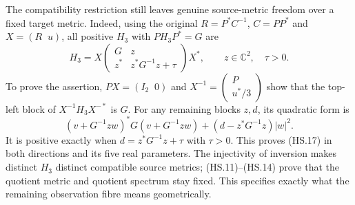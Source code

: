 The compatibility restriction still leaves genuine source-metric
freedom over a fixed target metric. Indeed, using the original
$R=P^*C^{-1}$, $C=PP^*$ and $X=(R\;\;u)$, all positive $H_3$
with $PH_3P^*=G$ are
\[
 H_3=X\begin{pmatrix}G&z\\z^*&z^*G^{-1}z+\tau\end{pmatrix}X^*,
 \qquad z\in\mathbb C^2,\quad \tau>0.                         \tag{HS.17}
\]
To prove the assertion, $PX=(I_2\;\;0)$ and
$X^{-1}=\left(\begin{smallmatrix}P\\u^*/3\end{smallmatrix}\right)$
show that the top-left block of $X^{-1}H_3X^{-*}$ is $G$.
For any remaining blocks $z,d$, its quadratic form is
\[
 (v+G^{-1}zw)^*G(v+G^{-1}zw)
       +(d-z^*G^{-1}z)|w|^2.
\]
It is positive exactly when $d=z^*G^{-1}z+\tau$ with $\tau>0$.
This proves (HS.17) in both directions and its five real parameters.
The injectivity of inversion makes distinct $H_3$ distinct compatible
source metrics; (HS.11)--(HS.14) prove that the quotient metric and
quotient spectrum stay fixed. This specifies exactly what the
remaining observation fibre means geometrically.

